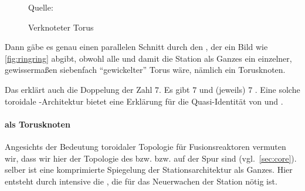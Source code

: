 \begin{figure}
    \centering
    \caption{Verknoteter Torus}
    Quelle:  \cite{knottedtorus}
    \label{fig:knottedtorus}
\end{figure}

Dann gäbe es genau einen parallelen Schnitt durch den , der ein Bild wie \cref{fig:ringring} abgibt, obwohl alle  und damit die Station als Ganzes ein einzelner, gewissermaßen siebenfach "`gewickelter"' Torus wäre, nämlich ein Torusknoten.

Das erklärt auch die Doppelung der Zahl $7$. Es gibt $7$  und (jeweils) $7$ . Eine solche toroidale -Architektur bietet eine Erklärung für die Quasi-Identität von  und .

\paragraph{ als Torusknoten}

Angesichts der Bedeutung toroidaler Topologie für Fusionsreaktoren vermuten wir, dass wir hier der Topologie des  bzw.  bzw.   auf der Spur sind (vgl.~\cref{sec:core}).  selber ist eine komprimierte Spiegelung der Stationsarchitektur als Ganzes. Hier entsteht durch intensive  die , die für das Neuerwachen der Station nötig ist.

